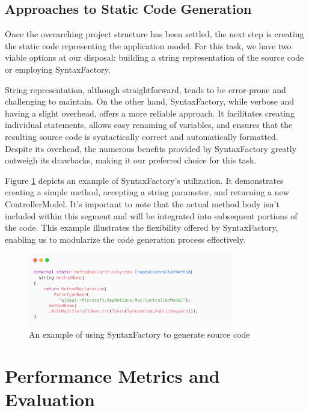 \subsection{Approaches to Static Code Generation}

Once the overarching project structure has been settled, the next step is creating the static code representing the application model. For this task, we have two viable options at our disposal: building a string representation of the source code or employing SyntaxFactory.

String representation, although straightforward, tends to be error-prone and challenging to maintain. On the other hand, SyntaxFactory, while verbose and having a slight overhead, offers a more reliable approach. It facilitates creating individual statements, allows easy renaming of variables, and ensures that the resulting source code is syntactically correct and automatically formatted. Despite its overhead, the numerous benefits provided by SyntaxFactory greatly outweigh its drawbacks, making it our preferred choice for this task. 

Figure \ref{fig:syntax-factory} depicts an example of SyntaxFactory's utilization. It demonstrates creating a simple method, accepting a string parameter, and returning a new ControllerModel. It's important to note that the actual method body isn't included within this segment and will be integrated into subsequent portions of the code. This example illustrates the flexibility offered by SyntaxFactory, enabling us to modularize the code generation process effectively.

\begin{figure}[H]
\centering
\includegraphics[width=0.8\textwidth]{graphics/syntax-factory.png}
\caption{An example of using SyntaxFactory to generate source code}
\label{fig:syntax-factory}
\end{figure}

\section{Performance Metrics and Evaluation}


